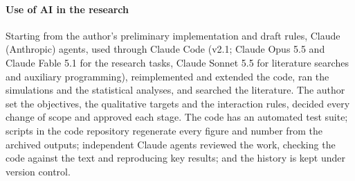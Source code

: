 \paragraph{Use of AI in the research}
Starting from the author's preliminary implementation and draft rules, Claude (Anthropic) agents, used through Claude
Code (v2.1; Claude Opus 5.5 and Claude Fable 5.1 for the research tasks, Claude Sonnet 5.5 for literature searches and
auxiliary programming), reimplemented and extended the code, ran the simulations and the statistical analyses, and
searched the literature. The author set the objectives, the qualitative targets and the interaction rules, decided
every change of scope and approved each stage. The code has an automated test suite; scripts in the code repository
regenerate every figure and number from the archived outputs; independent Claude agents reviewed the work, checking
the code against the text and reproducing key results; and the history is kept under version control.
